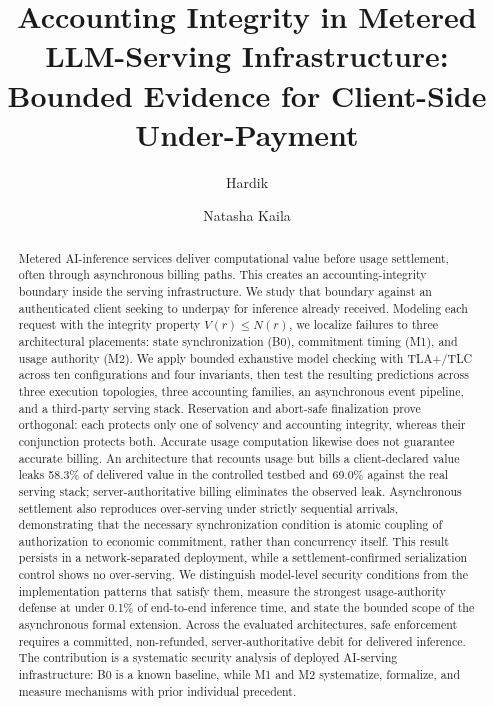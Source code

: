 \documentclass[manuscript,review]{acmart}
\begin{document}
\title{Accounting Integrity in Metered LLM-Serving Infrastructure:
Bounded Evidence for Client-Side Under-Payment}

\author{Hardik}

\author{Natasha Kaila}

\begin{abstract}
Metered AI-inference services deliver computational value before usage settlement, often
through asynchronous billing paths. This creates an accounting-integrity boundary inside
the serving infrastructure. We study that boundary against an authenticated client seeking
to underpay for inference already received. Modeling each request with the integrity
property $V(r) \le N(r)$, we localize failures to three architectural placements: state
synchronization (B0), commitment timing (M1), and usage authority (M2). We apply
bounded exhaustive model checking with TLA+/TLC across ten configurations and four invariants, then
test the resulting predictions across three execution topologies, three accounting
families, an asynchronous event pipeline, and a third-party serving stack. Reservation and
abort-safe finalization prove orthogonal: each protects only one of solvency and accounting
integrity, whereas their conjunction protects both. Accurate usage computation likewise
does not guarantee accurate billing. An architecture that recounts usage but bills a
client-declared value leaks 58.3\% of delivered value in the controlled testbed and 69.0\%
against the real serving stack; server-authoritative billing eliminates the observed leak.
Asynchronous settlement also reproduces over-serving under strictly sequential arrivals,
demonstrating that the necessary synchronization condition is atomic coupling of
authorization to economic commitment, rather than concurrency itself. This result persists
in a network-separated deployment, while a settlement-confirmed serialization control shows
no over-serving. We distinguish model-level security conditions from the implementation
patterns that satisfy them, measure the strongest usage-authority defense at under 0.1\% of
end-to-end inference time, and state the bounded scope of the asynchronous formal extension.
Across the evaluated architectures, safe enforcement requires a committed, non-refunded,
server-authoritative debit for delivered inference. The contribution is a systematic
security analysis of deployed AI-serving infrastructure: B0 is a known baseline, while M1
and M2 systematize, formalize, and measure mechanisms with prior individual precedent.
\end{abstract}
\end{document}
